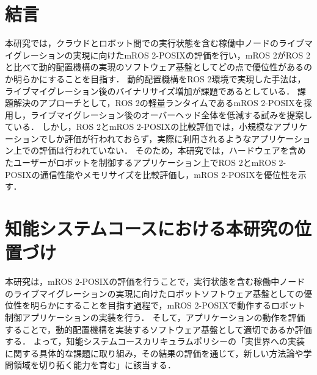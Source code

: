 \documentclass[11pt]{ujarticle}
\begin{document}
\section{結言}
本研究では，クラウドとロボット間での実行状態を含む稼働中ノードのライブマイグレーションの実現に向けたmROS 2-POSIXの評価を行い，mROS 2がROS 2と比べて動的配置機構の実現のソフトウェア基盤としてどの点で優位性があるのか明らかにすることを目指す．
動的配置機構をROS 2環境で実現した手法は，ライブマイグレーション後のバイナリサイズ増加が課題であるとしている．
課題解決のアプローチとして，ROS 2の軽量ランタイムであるmROS 2-POSIXを採用し，ライブマイグレーション後のオーバーヘッド全体を低減する試みを提案している．
しかし，ROS 2とmROS 2-POSIXの比較評価では，小規模なアプリケーションでしか評価が行われておらず，実際に利用されるようなアプリケーション上での評価は行われていない．
そのため，本研究では，ハードウェアを含めたユーザーがロボットを制御するアプリケーション上でROS 2とmROS 2-POSIXの通信性能やメモリサイズを比較評価し，mROS 2-POSIXを優位性を示す．

\section{知能システムコースにおける本研究の位置づけ}
本研究は，mROS 2-POSIXの評価を行うことで，実行状態を含む稼働中ノードのライブマイグレーションの実現に向けたロボットソフトウェア基盤としての優位性を明らかにすることを目指す過程で，mROS 2-POSIXで動作するロボット制御アプリケーションの実装を行う．
そして，アプリケーションの動作を評価することで，動的配置機構を実装するソフトウェア基盤として適切であるか評価する．
よって，知能システムコースカリキュラムポリシーの「実世界への実装に関する具体的な課題に取り組み，その結果の評価を通じて，新しい方法論や学問領域を切り拓く能力を育む」に該当する．
\end{document}
